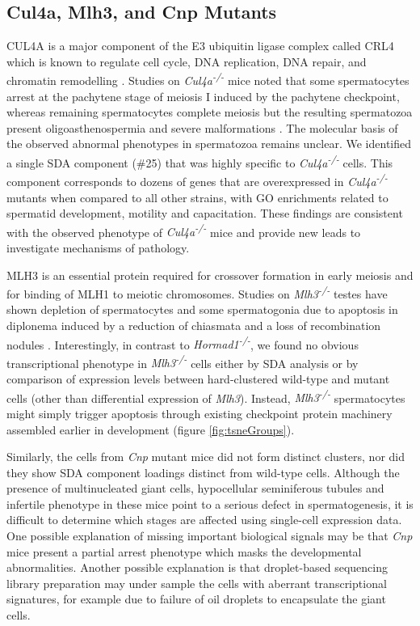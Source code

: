 \subsection{Cul4a, Mlh3, and Cnp Mutants}
CUL4A is a major component of the E3 ubiquitin ligase complex called CRL4 which is known to regulate cell cycle, DNA replication, DNA repair, and chromatin remodelling \parencite{Dubiel2018Cullin}. Studies on \textit{Cul4a\textsuperscript{-/-}} mice noted that some spermatocytes arrest at the pachytene stage of meiosis I induced by the pachytene checkpoint, whereas remaining spermatocytes complete meiosis but the resulting spermatozoa present oligoasthenospermia and severe malformations \parencite{Yin2011E3}. The molecular basis of the observed abnormal phenotypes in spermatozoa remains unclear. We identified a single SDA component (\#25) that was highly specific to \textit{Cul4a\textsuperscript{-/-}} cells. This component corresponds to dozens of genes that are overexpressed in \textit{Cul4a\textsuperscript{-/-}} mutants when compared to all other strains, with GO enrichments related to spermatid development, motility and capacitation. These findings are consistent with the observed phenotype of \textit{Cul4a\textsuperscript{-/-}} mice and provide new leads to investigate mechanisms of pathology.

MLH3 is an essential protein required for crossover formation in early meiosis and for binding of MLH1 to meiotic chromosomes. Studies on \textit{Mlh3\textsuperscript{-/-}} testes have shown depletion of spermatocytes and some spermatogonia due to apoptosis in diplonema induced by a reduction of chiasmata and a loss of recombination nodules \parencite{Lipkin2002Meiotic}. Interestingly, in contrast to \textit{Hormad1\textsuperscript{-/-}}, we found no obvious transcriptional phenotype in \textit{Mlh3\textsuperscript{-/-}} cells either by SDA analysis or by comparison of expression levels between hard-clustered wild-type and mutant cells (other than differential expression of \textit{Mlh3}). Instead, \textit{Mlh3\textsuperscript{-/-}} spermatocytes might simply trigger apoptosis through existing checkpoint protein machinery assembled earlier in development (figure \ref{fig:tsneGroups}).

Similarly, the cells from \textit{Cnp} mutant mice did not form distinct clusters, nor did they show SDA component loadings distinct from wild-type cells. Although the presence of multinucleated giant cells, hypocellular seminiferous tubules and infertile phenotype in these mice point to a serious defect in spermatogenesis, it is difficult to determine which stages are affected using single-cell expression data. One possible explanation of missing important biological signals may be that \textit{Cnp} mice present a partial arrest phenotype which masks the developmental abnormalities. Another possible explanation is that droplet-based sequencing library preparation may under sample the cells with aberrant transcriptional signatures, for example due to failure of oil droplets to encapsulate the giant cells.

